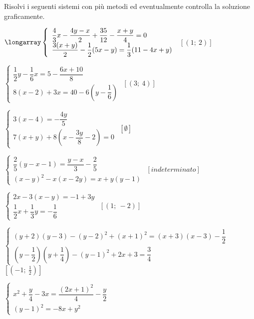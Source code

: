 \begin{esercizio}[\Ast]
 \label{ese:22.75}
 Risolvi i seguenti sistemi con più metodi ed eventualmente controlla
la soluzione graficamente.
\begin{enumeratea}
 {\longarray
 \item \(\longarray\left\{\begin{array}{l}
 \dfrac{4}{3}x-\dfrac{4y-x}{2}+\dfrac{35}{12}-\dfrac{x+y}{4}=0\\
 \dfrac{3(x+y)}{2}-\dfrac{1}{2}(5x-y)=\dfrac{1}{3}(11-4x+y)\end{array}\right.\)
 \hfill \(\left[(1;~2)\right]\)
\item \(\left\{\begin{array}{l}
\dfrac{1}{2}y-\dfrac{1}{6}x=5-\dfrac{6x+10}{8}\\
8(x-2)+3x=40-6\left(y-\dfrac{1}{6}\right)\end{array}\right.\)
 \hfill \(\left[(3;~4)\right]\)
\item \(\left\{\begin{array}{l}
3(x-4)=-{\dfrac{4y}{5}}\\
7(x+y)+8\left(x-\dfrac{3y}{8}
-2\right)=0\end{array}\right.\)
 \hfill \(\left[\emptyset\right]\)
\item \(\left\{\begin{array}{l}
\dfrac{2}{5}(y-x-1)=\dfrac{y-x}{3}-\dfrac{2}{5}\\
(x-y)^{2}-x(x-2y)=x+y(y-1)\end{array}\right.\)
 \hfill \(\left[indeterminato\right]\)
\item \(\left\{\begin{array}{l}
2x-3(x-y)=-1+3y\\
\dfrac{1}{2}x+\dfrac{1}{3}y=-{\dfrac{1}{6}}\end{array}\right.\)
 \hfill \(\left[(1;~-2)\right]\)
\item \(\left\{\begin{array}{l}
(y+2)(y-3)-(y-2)^{2}+(x+1)^{2}=(x+3)(x-3)-\dfrac{1}{2}\\
\left(y-\dfrac{1}{2}\right)\left(y+\dfrac{1}{4}\right)-(y-1)^{2}+2x+3=
    \dfrac{3}{4}\end{array}\right.\)
 \hfill \(\left[(-1;~\frac{1}{2})\right]\)
\item \(\left\{\begin{array}{l}
x^{2}+\dfrac{y}{4}-3x=\dfrac{(2x+1)^{2}}{4}-\dfrac{y}{2}\\
(y-1)^{2}=-8x+y^{2}\end{array}\right.\)
}
\end{enumeratea}
\end{esercizio}
